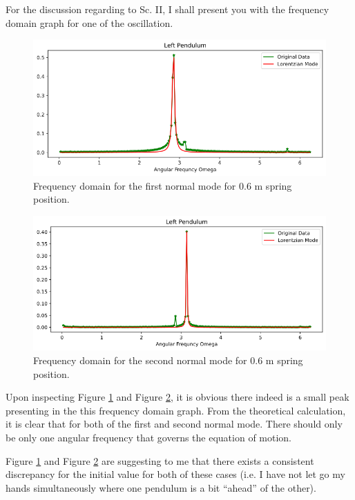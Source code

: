 \documentclass[aps,prl,reprint,10pt,amsmath,amssymb,superscriptaddress,a4paper]{revtex4-2}
\begin{document}
For the discussion regarding to Sc. II, I shall present you with the frequency domain graph for one of the oscillation.
\begin{widetext}

\begin{figure}[H]
    \includegraphics[width = 18 cm]{images/LM1.png}
    \caption{Frequency domain for the first normal mode for 0.6 m spring position. \label{fig4}}
\end{figure}

\begin{figure}[H]
    \includegraphics[width = 18 cm]{images/LM2.png}
    \caption{Frequency domain for the second normal mode for 0.6 m spring position. \label{fig5}}
\end{figure}
\end{widetext}

Upon inspecting Figure \ref{fig4} and Figure \ref{fig5}, it is obvious there indeed is a small peak presenting in the this frequency domain graph. From the theoretical calculation, it is clear that for both of the first and second normal mode. There should only be only one angular frequency that governs the equation of motion.

Figure \ref{fig4} and Figure \ref{fig5} are suggesting to me that there exists a consistent discrepancy for the initial value for both of these cases (i.e. I have not let go my hands simultaneously where one pendulum is a bit ``ahead'' of the other). 
\end{document}
